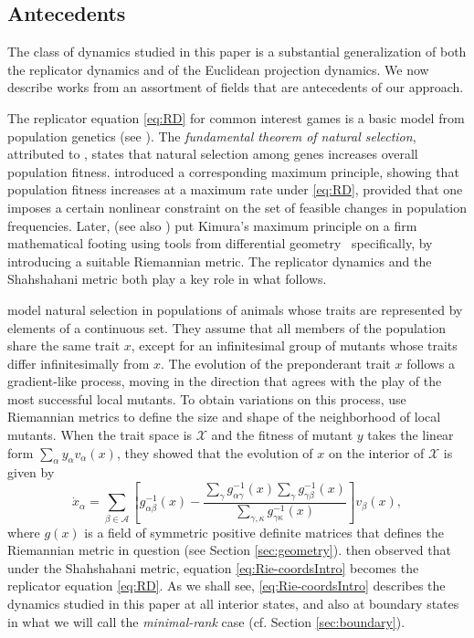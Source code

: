 \documentclass[reqno]{amsart}
\theoremstyle{plain}
\theoremstyle{definition}
\theoremstyle{remark}
\numberwithin{equation}{section}
\numberwithin{theorem}{section}
\begin{document}
\subsection{Antecedents}
\label{sec:previous}

The class of dynamics studied in this paper is a substantial generalization of both the replicator dynamics and of the Euclidean projection dynamics.
We now describe works from an assortment of fields that are antecedents of our approach.

The replicator equation \eqref{eq:RD} for common interest games
is a basic model from population genetics (see \citealp{SS83}).
The \emph{fundamental theorem of natural selection}, attributed to \cite{Fis30}, states that natural selection among genes increases overall population fitness.
\cite{Kim58} introduced a corresponding maximum principle, showing that population fitness increases at a maximum rate under \eqref{eq:RD}, provided that one imposes a certain nonlinear constraint on the set of feasible changes in population frequencies.
Later, \cite{Sha79} (see also \citealp{Aki79}) put Kimura's maximum principle on a firm mathematical footing using tools from differential geometry \textendash\ specifically, by introducing a suitable Riemannian metric.
The replicator dynamics and the Shahshahani metric both play a key role in what follows.

\cite{HS90} model natural selection in populations of animals whose traits are represented by elements of a continuous set.
They assume that all members of the population share the same trait $x$, except for an infinitesimal group of mutants whose traits differ infinitesimally from $x$. 
The evolution of the preponderant trait $x$ follows a gradient-like process, moving in the direction that agrees with the play of the most successful local mutants.
To obtain variations on this process, \cite{HS90} use Riemannian metrics to define the size and shape of the neighborhood of local mutants.
When the trait space is ${\mathcal{X}}$ and the fitness of mutant $y$ takes the linear form $\sum_{\alpha} y_{\alpha} {v}_{\alpha}(x)$, they showed that the evolution of $x$ on the interior of ${\mathcal{X}}$ is given by
\begin{equation}
\label{eq:Rie-coordsIntro}
\dot x_{\alpha}
	= \sum_{\beta\in{\mathcal{A}}} \left[
	g_{\alpha\beta}^{-1}(x)
	- \frac{\sum_{\gamma} g_{\alpha\gamma}^{-1}(x)  \sum_{\gamma} g_{\gamma\beta}^{-1}(x)}{\sum_{\gamma,\kappa} g_{\gamma\kappa}^{-1}(x)}
	\right]
	{v}_{\beta}(x),
\end{equation}
where $g(x)$ is a field of symmetric positive definite matrices that defines the Riemannian metric in question (see Section \ref{sec:geometry}).
\cite{HS90} then observed that under the Shahshahani metric, equation \eqref{eq:Rie-coordsIntro} becomes the replicator equation \eqref{eq:RD}.
As we shall see, \eqref{eq:Rie-coordsIntro} describes the dynamics studied in this paper at all interior states, and also at boundary states in what we will call the \emph{minimal-rank} case (cf. Section \ref{sec:boundary}).
\end{document}
